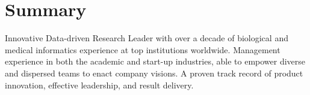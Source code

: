 \section{Summary}
\noindent Innovative Data-driven Research Leader with over a decade of biological and medical informatics experience at top institutions worldwide. Management experience in both the academic and start-up industries, able to empower diverse and dispersed teams to enact company visions. A proven track record of product innovation, effective leadership, and result delivery.
